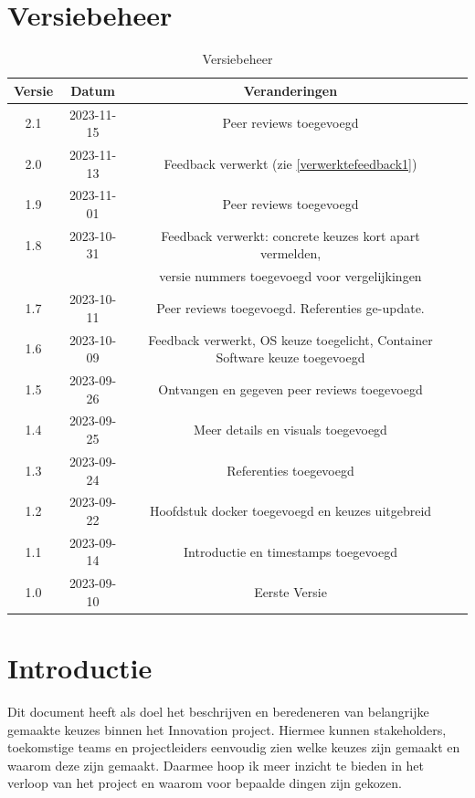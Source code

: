 \documentclass[a4paper]{report}
\begin{document}
\tableofcontents

\chapter{Versiebeheer}
\begin{table}[h]
    \centering
    \begin{tabular}{|c|c|c|p{5cm}|}
        \hline
        \textbf{Versie} & \textbf{Datum} & \textbf{Veranderingen}  \\
        \hline
        2.1   & 2023-11-15 & Peer reviews toegevoegd \\
        \hline
        2.0   & 2023-11-13 & Feedback verwerkt (zie \ref{verwerktefeedback1}) \\
        \hline
        1.9   & 2023-11-01 & Peer reviews toegevoegd \\
        \hline
        1.8   & 2023-10-31 & Feedback verwerkt: concrete keuzes kort apart vermelden, \\  & & versie nummers toegevoegd voor vergelijkingen \\
        \hline
        1.7   & 2023-10-11 & Peer reviews toegevoegd. Referenties ge-update. \\
        \hline
        1.6    & 2023-10-09 & Feedback verwerkt, OS keuze toegelicht, Container Software keuze toegevoegd \\
        \hline
        1.5    & 2023-09-26 & Ontvangen en gegeven peer reviews toegevoegd \\
        \hline
        1.4    & 2023-09-25 & Meer details en visuals toegevoegd \\
        \hline
        1.3    & 2023-09-24 & Referenties toegevoegd \\
        \hline
        1.2    & 2023-09-22 & Hoofdstuk docker toegevoegd en keuzes uitgebreid \\
        \hline
        1.1    & 2023-09-14 & Introductie en timestamps toegevoegd\\
        \hline
        1.0    & 2023-09-10 & Eerste Versie \\
        \hline
    \end{tabular}
    \caption{Versiebeheer}
\end{table}


\chapter{Introductie}
Dit document heeft als doel het beschrijven en beredeneren van belangrijke gemaakte keuzes binnen het Innovation project. 
Hiermee kunnen stakeholders, toekomstige teams en projectleiders eenvoudig zien welke keuzes zijn gemaakt en waarom deze zijn gemaakt.
Daarmee hoop ik meer inzicht te bieden in het verloop van het project en waarom voor bepaalde dingen zijn gekozen. 
\vspace{1.5cm}
\end{document}
